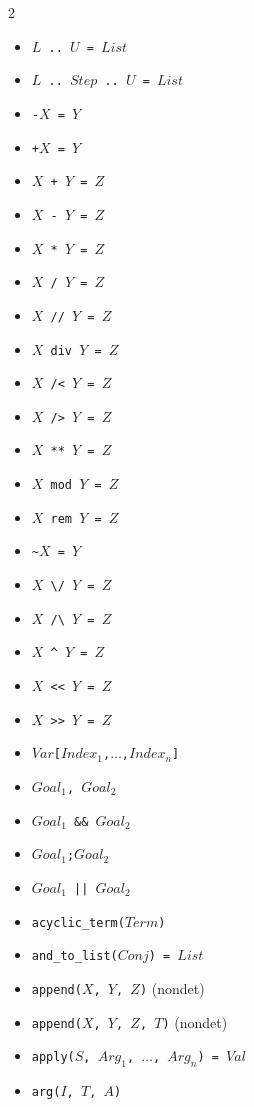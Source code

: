 \documentclass[10pt]{article}
\begin{document}
\begin{multicols}{2}
\begin{scriptsize}
\begin{itemize}
    \item {\tt $L$ \verb+..+ $U$ = $List$} 
    \item {\tt $L$ \verb+..+ $Step$ \verb+..+ $U$ = $List$} 
    \item {\tt \verb+-+$X$ = $Y$}
    \item {\tt \verb-+-$X$ = $Y$}
    \item {\tt $X$ \verb-+- $Y$ = $Z$} 
    \item {\tt $X$ \verb+-+ $Y$ = $Z$} 
    \item {\tt $X$ \verb+*+ $Y$ = $Z$} 
    \item {\tt $X$ \verb+/+ $Y$ = $Z$} 
    \item {\tt $X$ \verb+//+ $Y$ = $Z$} 
    \item \texttt{$X$ div $Y$ = $Z$} 
    \item {\tt $X$ \verb+/<+ $Y$ = $Z$} 
    \item {\tt $X$ \verb+/>+ $Y$ = $Z$} 
    \item {\tt $X$ \verb+**+ $Y$ = $Z$} 
    \item \texttt{$X$ mod $Y$ = $Z$} 
    \item \texttt{$X$ rem $Y$ = $Z$} 
    \item {\tt \verb+~+$X$ = $Y$} 
    \item {\tt $X$ \verb+\/+ $Y$ = $Z$} 
    \item {\tt $X$ \verb+/\+ $Y$ = $Z$} 
    \item {\tt $X$ \verb+^+ $Y$ = $Z$} 
    \item {\tt $X$ \verb+<<+ $Y$ = $Z$} 
    \item {\tt $X$ \verb+>>+ $Y$ = $Z$} 
    \item {\tt $Var$\verb+[+$Index_1$,$\ldots$,$Index_n$\verb+]+}
    \item \texttt{$Goal_1$, $Goal_2$}
    \item \texttt{$Goal_1$ \&\& $Goal_2$}
    \item \texttt{$Goal_1$;$Goal_2$}
    \item \texttt{$Goal_1$ || $Goal_2$}
    \item \texttt{acyclic\_term($Term$)}
    \item \texttt{and\_to\_list($Conj$) = $List$}
    \item \texttt{append($X$, $Y$, $Z$)}  (nondet)
    \item \texttt{append($X$, $Y$, $Z$, $T$)}  (nondet)
    \item \texttt{apply($S$, $Arg_1$, $\ldots$, $Arg_n$) = $Val$}
    \item \texttt{arg($I$, $T$, $A$)}    

\end{itemize}
\end{scriptsize}
\end{multicols}
\end{document}
